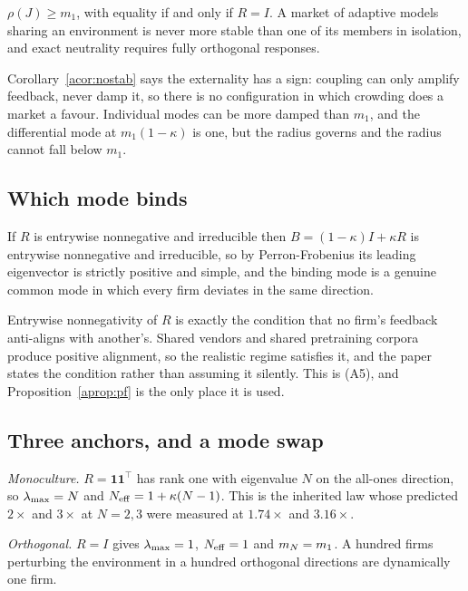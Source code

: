 \begin{acorollary}
\label{acor:nostab}
$\rho(J) \geq m_1$, with equality if and only if $R=I$. A market of adaptive models sharing an environment is never more stable than one of its members in isolation, and exact neutrality requires fully orthogonal responses.
\end{acorollary}

Corollary~\ref{acor:nostab} says the externality has a sign: coupling can only amplify feedback, never damp it, so there is no configuration in which crowding does a market a favour. Individual modes can be more damped than $m_1$, and the differential mode at $m_1(1-\kappa)$ is one, but the radius governs and the radius cannot fall below $m_1$.

\subsection{Which mode binds}

\begin{aproposition}
\label{aprop:pf}
If $R$ is entrywise nonnegative and irreducible then $B=(1-\kappa)I+\kappa R$ is entrywise nonnegative and irreducible, so by Perron-Frobenius its leading eigenvector is strictly positive and simple, and the binding mode is a genuine common mode in which every firm deviates in the same direction.
\end{aproposition}

Entrywise nonnegativity of $R$ is exactly the condition that no firm's feedback anti-aligns with another's. Shared vendors and shared pretraining corpora produce positive alignment, so the realistic regime satisfies it, and the paper states the condition rather than assuming it silently. This is (A5), and Proposition~\ref{aprop:pf} is the only place it is used.

\subsection{Three anchors, and a mode swap}

\emph{Monoculture.} $R=\mathbf{1}\mathbf{1}^{\top}$ has rank one with eigenvalue $N$ on the all-ones direction, so $\lambda_{\max}=N$ and $N_{\mathrm{eff}} = 1+\kappa(N-1)$. This is the inherited law whose predicted $2\times$ and $3\times$ at $N=2,3$ were measured at $1.74\times$ and $3.16\times$.

\emph{Orthogonal.} $R=I$ gives $\lambda_{\max}=1$, $N_{\mathrm{eff}}=1$ and $m_N = m_1$. A hundred firms perturbing the environment in a hundred orthogonal directions are dynamically one firm.

